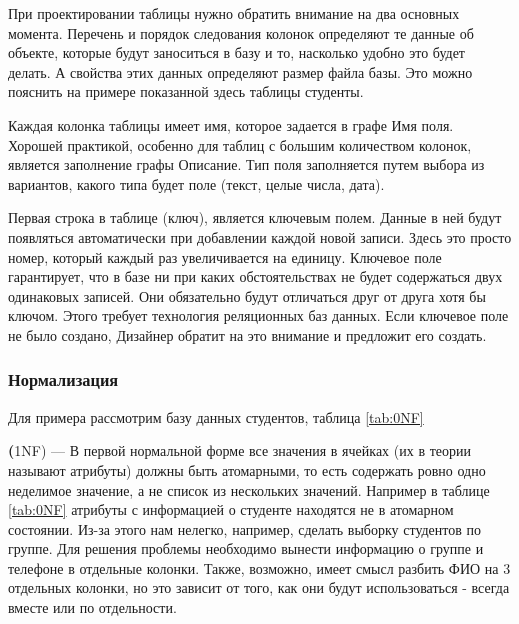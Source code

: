 \documentclass[a4paper]{article}
\begin{document}
При проектировании таблицы нужно обратить внимание на два основных момента. Перечень и порядок следования колонок определяют те данные об объекте, которые будут заноситься в базу и то, насколько удобно это будет делать. А свойства этих данных определяют размер файла базы. Это можно пояснить на примере показанной здесь таблицы студенты.

\begin{figure}[h]
\end{figure}

Каждая колонка таблицы имеет имя, которое задается в графе Имя поля. Хорошей практикой, особенно для таблиц с большим количеством колонок, является заполнение графы Описание. Тип поля заполняется путем выбора из вариантов, какого типа будет поле (текст, целые числа, дата).

Первая строка в таблице (ключ), является ключевым полем. Данные в ней будут появляться автоматически при добавлении каждой новой записи. Здесь это просто номер, который каждый раз увеличивается на единицу. Ключевое поле гарантирует, что в базе ни при каких обстоятельствах не будет содержаться двух одинаковых записей. Они обязательно будут отличаться друг от друга хотя бы ключом. Этого требует технология реляционных баз данных. Если ключевое поле не было создано, Дизайнер обратит на это внимание и предложит его создать.

\newpage
\subsubsection{Нормализация}
Для примера рассмотрим базу данных студентов, таблица \ref{tab:0NF}

\textbf(1NF) --- В первой нормальной форме все значения в ячейках (их в теории называют атрибуты) должны быть атомарными, то есть содержать ровно одно неделимое значение, а не список из нескольких значений. Например в таблице \ref{tab:0NF} атрибуты с информацией о студенте находятся не в атомарном состоянии. Из-за этого нам нелегко, например, сделать выборку студентов по группе. Для решения проблемы необходимо вынести информацию о группе и телефоне в отдельные колонки. Также, возможно, имеет смысл разбить ФИО на 3 отдельных колонки, но это зависит от того, как они будут использоваться - всегда вместе или по отдельности.
\end{document}
